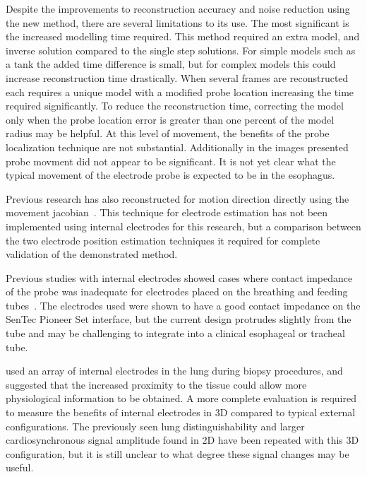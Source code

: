 Despite the improvements to reconstruction accuracy 
and noise reduction using the new method, there are several limitations to its use. The most significant is 
the increased modelling time required. This method required an extra model, and inverse 
solution compared to the single step solutions. For simple models such as 
a tank the added time difference
is small, but for complex models this could increase reconstruction time drastically. 
When several frames are reconstructed each requires a unique model 
with a modified probe location increasing the time required significantly. 
To reduce the reconstruction 
time, correcting the model only when the  probe location error is greater than one 
percent of the model radius may be helpful. At this 
level of movement, the benefits of 
the probe localization technique are 
not substantial. 
Additionally in the images presented probe movment did not 
appear to be significant. It is not yet clear what the typical movement of the electrode probe 
is expected to be in the esophagus. 

Previous research has also 
reconstructed for motion direction directly using the movement
jacobian~\parencite{boyle_geophysical_2016,gomez-laberge_direct_2008,soleimani_imaging_2006}.
This technique for electrode estimation has not been implemented using internal electrodes 
for this research, but a comparison between the two electrode position estimation techniques 
it required for complete validation of the demonstrated method.

Previous studies with internal electrodes showed cases where contact impedance of the probe
was inadequate for electrodes
placed on the breathing and feeding tubes~\parencite{czaplik_application_2014}.
The electrodes used were shown to have a good contact impedance on the SenTec Pioneer
Set interface, but the current design protrudes slightly from the tube and may be challenging to 
integrate into a clinical esophageal or tracheal tube.

 used an array of internal electrodes in the lung 
during biopsy procedures, and suggested that the increased proximity to the 
tissue could allow more physiological information to be obtained. A more complete 
evaluation is required to measure the benefits of internal electrodes in 3D compared 
to typical external configurations. The previously seen lung distinguishability
and larger cardiosynchronous signal amplitude found in 2D\parencite{czaplik_application_2014} 
have been repeated with this 3D configuration, but it is still unclear to what 
degree these signal changes may be useful. 

